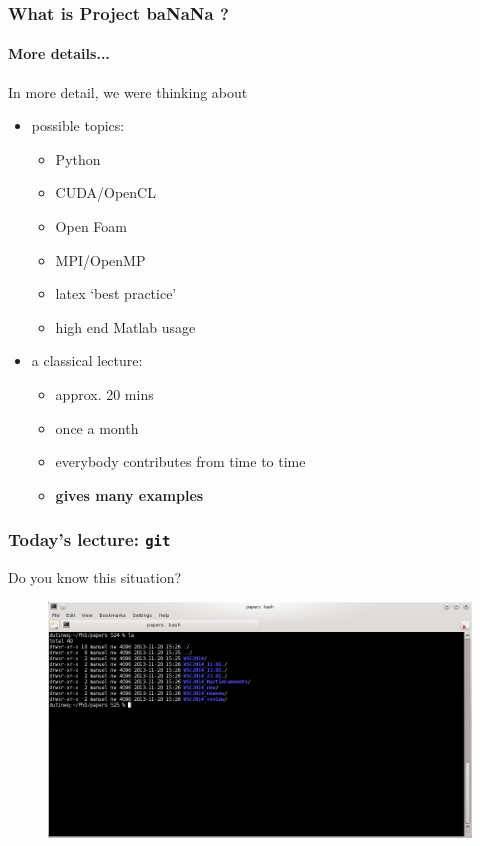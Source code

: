 \documentclass{beamer}
\begin{document}
\begin{frame}
\frametitle{What is Project baNaNa ?}
\framesubtitle{More details...}
In more detail, we were thinking about
\begin{itemize}
 \item possible topics:
 \begin{itemize}
 \item Python
 \item CUDA/OpenCL
 \item Open Foam
 \item MPI/OpenMP
 \item latex `best practice'
 \item high end Matlab usage
 \end{itemize}
 \item a classical lecture:
  \begin{itemize}
 \item approx. 20 mins
 \item once a month
 \item everybody contributes from time to time
 \item \textbf{gives many examples}
 \end{itemize}
\end{itemize}
\end{frame}
\begin{frame}
\frametitle{Today's lecture: \texttt{git}}
Do you know this situation?
\begin{figure}
\centering
 \includegraphics[height=0.64\textheight]{images/screenshot.png}
\end{figure}
\end{frame}
\end{document}
